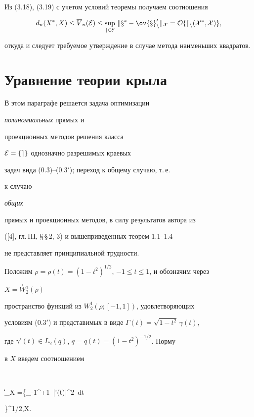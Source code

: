Из (3.18), (3.19) с учетом условий теоремы получаем соотношения


$$


d_n(X^*,X)\leq \overline{V}_n(\cal E)\leq \sup_{e\in \cal E}\,


\|x^*-\ov{x}^0_n\|_X =O\{ d_n(X^*,X)\},


$$


откуда и следует требуемое утверждение в случае метода наименьших квадратов.





\section{Уравнение теории крыла}





В этом параграфе решается задача оптимизации


{\it полиномиальных} прямых и


проекционных методов решения класса


$\cal E=\{ e\}$ однозначно разрешимых краевых


задач вида (0.3)--($0.3'$); переход к общему случаю, т.\,е.


к случаю


{\it общих}


\rm прямых и проекционных методов, в силу результатов автора из


([4], гл.\,III, \S\,\S\,2, 3) и вышеприведенных теорем 1.1--1.4


не представляет принципиальной трудности.





Положим $\rho=\rho(t)=(1-t^2)^{1/2}$, $-1\leq t\leq 1$, и обозначим через


$X=\overset{\circ}{W}{}_2^1(\rho)$


пространство функций из $W_2^1(\rho ;[-1,1])$, удовлетворяющих


условиям ($0.3'$) и представимых в виде $\Gamma(t)=\sqrt{1-t^2}\, \gamma(t)$,


где $\gamma'(t)\in L_2(q)$, $q=q(t)=(1-t^2)^{-1/2}$. Норму


в $X$ введем соотношением


$$


\|\Gamma\|_X =\bigg\{\int_{-1}^{+1}\, |\Gamma'(t)|^2\, dt


\bigg\}^{1/2},\quad \Gamma\in X.


